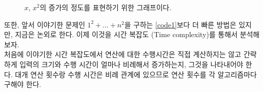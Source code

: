 \documentclass{article}
\begin{document}
        \begin{figure}
            \centering
            \caption{$x$, $x^{2}$의 증가의 정도를 표현하기 위한 그래프이다.}
            \label{graph1}
        \end{figure}
        또한, 앞서 이야기한 문제인 $1^{2} + ... + n^{2}$을 구하는 \ref{code1}보다 더 빠른 방법은 있지만, 지금은 논외로 한다.
        이제 이것을 시간 복잡도 (Time complexity)를 통해서 분석해보자. \\
        처음에 이야기한 시간 복잡도에서 연산에 대한 수행시간은 직접 계산하지는 않고 간략하게 입력의 크기와 수행 시간이 얼마나 비례해서 증가하는지, 그것을 나타내어야 한다.
        대개 연산 횟수랑 수행 시간은 비례 관계에 있으므로 연산 횟수를 각 알고리즘마다 구해야 한다. \\ \\
\end{document}
